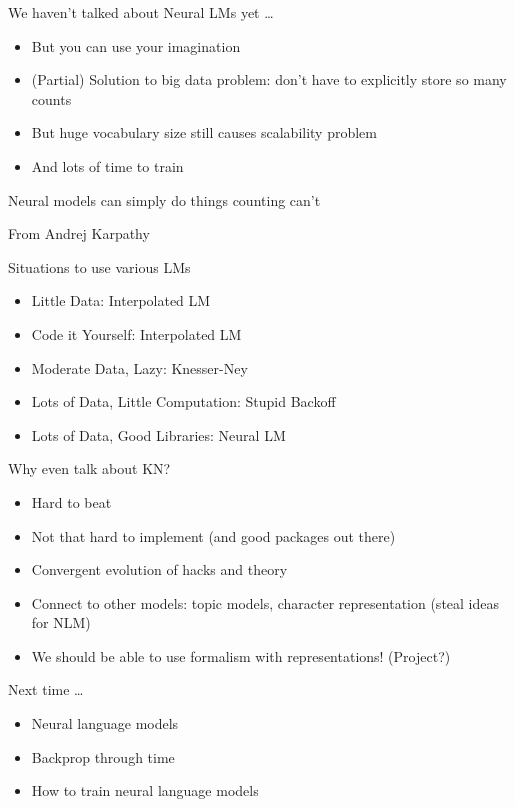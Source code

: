 \documentclass[compress]{beamer}
\newcommand{\gfx}[2]{
\begin{center}
	\texttt{[image: lm/\#1]}
\end{center}
}
\begin{document}
\begin{frame}{We haven't talked about Neural LMs yet \dots}

  \begin{itemize}
    \item But you can use your imagination
    \item (Partial) Solution to big data problem: don't have to explicitly store so many counts
    \item But huge vocabulary size still causes scalability problem
    \item And lots of time to train
  \end{itemize}

\end{frame}

\begin{frame}{Neural models can simply do things counting can't}

  \begin{center}
  \end{center}

  \begin{center}
    From Andrej Karpathy
  \end{center}
\end{frame}

\begin{frame}{Situations to use various LMs}

  \begin{itemize}
    \item Little Data: Interpolated LM
    \item Code it Yourself: Interpolated LM
    \item Moderate Data, Lazy: Knesser-Ney
    \item Lots of Data, Little Computation: Stupid Backoff
    \item Lots of Data, Good Libraries: Neural LM
   \end{itemize}

\end{frame}


\begin{frame}{Why even talk about KN?}

  \begin{itemize}
    \item Hard to beat
    \item Not that hard to implement (and good packages out there)
    \item Convergent evolution of hacks and theory
    \item Connect to other models: topic models, character representation (steal ideas for NLM)
    \item We should be able to use formalism with representations! (Project?)
  \end{itemize}

\end{frame}

\begin{frame}{Next time \dots}

  \begin{itemize}
    \item Neural language models
    \item Backprop through time
    \item How to train neural language models
  \end{itemize}

\end{frame}
\end{document}
